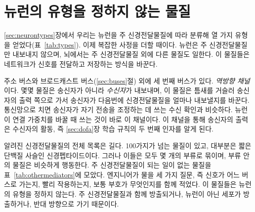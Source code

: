 \chapter{뉴런의 유형을 정하지 않는 물질}
\label{sec:othermediators}

\ref{sec:neurontypes}장에서 우리는 뉴런을 주 신경전달물질에 따라 분류해 열 가지 유형을 얻었다(표~\ref{tab:types}). 이제 복잡한 사정을 더할 때이다. 뉴런은 주 신경전달물질만 내보내지 않으며, 뇌에서는 주 신경전달물질 외에 다른 물질도 일한다. 이 물질들은 네트워크가 신호를 전달하고 저장하는 방식을 바꾼다.

주소 버스와 브로드캐스트 버스(\ref{sec:buses}절) 외에 세 번째 버스가 있다. \emph{역방향 채널}이다. 몇몇 물질은 송신자가 아니라 \emph{수신자}가 내보내며, 이 물질은 틈새를 거슬러 송신자의 출력 쪽으로 가서 송신자가 다음번에 신경전달물질을 얼마나 내보낼지를 바꾼다. 통신망으로 치면 송신자가 자기 전송을 조정하는 데 쓰는 수신 확인과 비슷하다. 뉴런이 연결 가중치를 바꿀 때 쓰는 것이 바로 이 채널이다. 이 채널을 통해 송신자의 출력은 수신자의 활동, 즉 \ref{sec:dofa}장 학습 규칙의 두 번째 인자를 알게 된다.

알려진 신경전달물질의 전체 목록은 길다. 100가지가 넘는 물질이 있고, 대부분은 짧은 단백질 사슬인 신경펩타이드이다. 그러나 이들은 모두 몇 개의 부류로 묶이며, 부류 안의 물질은 비슷하게 행동한다. 주 신경전달물질이 되는 일이 없는 물질을 표~\ref{tab:othermediators}에 모았다. 엔지니어가 물을 세 가지 질문, 즉 신호가 어느 버스로 가는지, 빨리 작용하는지, 보통 부호가 무엇인지를 함께 적었다. 이 물질들은 뉴런의 유형을 정하지 않는다. 주 신경전달물질과 함께 방출되거나, 뉴런이 아닌 세포가 방출하거나, 반대 방향으로 가기 때문이다.

